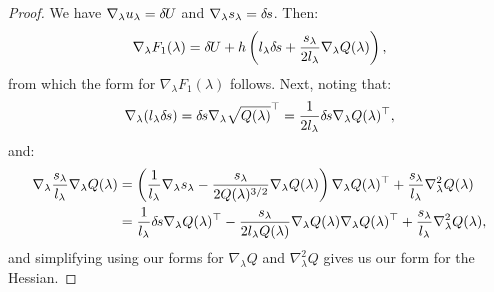 \documentclass[eikonal.tex]{subfiles}
\begin{document}
\begin{proof}
  We have $\nabla_\lambda u_\lambda = {\delta \hspace{-0.09em} U}$ and
  $\nabla_\lambda s_\lambda = {\delta \hspace{-0.1em} s}$. Then:
  \begin{align*}
    \nabla_\lambda F_1(\lambda) = {\delta \hspace{-0.09em} U} + h \left(l_\lambda {\delta \hspace{-0.1em} s} + \frac{s_\lambda}{2 l_\lambda} \nabla_\lambda Q(\lambda)\right),
  \end{align*}
  from which the form for $\nabla_\lambda F_1(\lambda)$ follows. Next,
  noting that:
  \begin{align*}
    \nabla_\lambda (l_\lambda {\delta \hspace{-0.1em} s}) = {\delta \hspace{-0.1em} s} \nabla_\lambda \sqrt{Q(\lambda)}^\top = \frac{1}{2l_\lambda} {\delta \hspace{-0.1em} s} \nabla_\lambda Q(\lambda)^\top,
  \end{align*}
  and:
  \begin{align*}
    \nabla_\lambda \frac{s_\lambda}{l_\lambda} \nabla_\lambda Q(\lambda)
    &= \left(\frac{1}{l_\lambda} \nabla_\lambda s_\lambda - \frac{s_\lambda}{2 Q(\lambda)^{3/2}} \nabla_\lambda Q(\lambda)\right) \nabla_\lambda Q(\lambda)^\top + \frac{s_\lambda}{l_\lambda} \nabla^2_\lambda Q(\lambda) \\
    &= \frac{1}{l_\lambda} {\delta \hspace{-0.1em} s} \nabla_\lambda Q(\lambda)^\top - \frac{s_\lambda}{2 l_\lambda Q(\lambda)} \nabla_\lambda Q(\lambda) \nabla_\lambda Q(\lambda)^\top + \frac{s_\lambda}{l_\lambda} \nabla_\lambda^2 Q(\lambda),
  \end{align*}
  and simplifying using our forms for $\nabla_\lambda Q$ and
  $\nabla_\lambda^2 Q$ gives us our form for the Hessian.
\end{proof}
\end{document}
